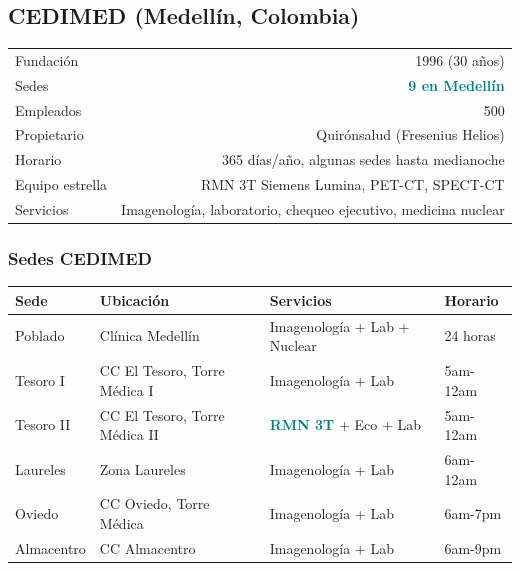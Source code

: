 \documentclass[11pt, a4paper]{article}
\newcommand{\highlight}[1]{\textcolor{teal}{\textbf{#1}}}
\newcommand{\fuente}[1]{\par\vspace{2pt}{\scriptsize\textcolor{slate}{Fuente: #1}}}
\begin{document}
\fuente{Newsweek World's Best Hospitals 2026, U.S. News 2025-2026}

\subsection{CEDIMED (Medell\'{i}n, Colombia)}

\begin{center}
\begin{tabular}{@{}lr@{}}
\toprule
Fundaci\'{o}n & 1996 (30 a\~{n}os) \\
Sedes & \highlight{9 en Medell\'{i}n} \\
Empleados & 500 \\
Propietario & Quir\'{o}nsalud (Fresenius Helios) \\
Horario & 365 d\'{i}as/a\~{n}o, algunas sedes hasta medianoche \\
Equipo estrella & RMN 3T Siemens Lumina, PET-CT, SPECT-CT \\
Servicios & Imagenolog\'{i}a, laboratorio, chequeo ejecutivo, medicina nuclear \\
\bottomrule
\end{tabular}
\end{center}

\subsubsection{Sedes CEDIMED}

\begin{center}
\small
\begin{tabular}{@{}llll@{}}
\toprule
\textbf{Sede} & \textbf{Ubicaci\'{o}n} & \textbf{Servicios} & \textbf{Horario} \\
\midrule
Poblado & Cl\'{i}nica Medell\'{i}n & Imagenolog\'{i}a + Lab + Nuclear & 24 horas \\
Tesoro I & CC El Tesoro, Torre M\'{e}dica I & Imagenolog\'{i}a + Lab & 5am-12am \\
Tesoro II & CC El Tesoro, Torre M\'{e}dica II & \highlight{RMN 3T} + Eco + Lab & 5am-12am \\
Laureles & Zona Laureles & Imagenolog\'{i}a + Lab & 6am-12am \\
Oviedo & CC Oviedo, Torre M\'{e}dica & Imagenolog\'{i}a + Lab & 6am-7pm \\
Almacentro & CC Almacentro & Imagenolog\'{i}a + Lab & 6am-9pm \\
\bottomrule
\end{tabular}
\end{center}
\end{document}
